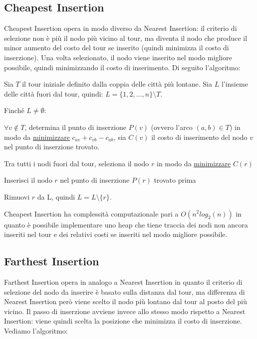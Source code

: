 \documentclass[a4paper,12pt]{report}
\begin{document}
\subsection{Cheapest Insertion} \label{ssec:CI}
Cheapest Insertion opera in modo diverso da Nearest Insertion: il criterio di selezione non è più il nodo più vicino al tour, ma diventa il nodo che produce il minor aumento del costo del tour se inserito (quindi minimizza il costo di inserzione). Una volta selezionato, il nodo viene inserito nel modo migliore possibile, quindi minimizzando il costo di inserimento. Di seguito l'algoritmo:

\begin{tcolorbox}[colframe=black,colback=white,boxrule=0.5pt, sharp corners]
  \begin{legal}
    \item Sia $T$ il tour iniziale definito dalla coppia delle città più lontane. Sia $L$ l'insieme delle città fuori dal tour, quindi: $L = \{1, 2, ..., n\} \setminus T$.
    \item Finché $L \neq \emptyset$:
    \begin{legal}
      \item $\forall v \not \in T$, determina il punto di inserzione $P(v)$ (ovvero l'arco $(a, b) \in T$) in modo da \underline{minimizzare} $c_{av} + c_{vb} - c_{ab}$, sia $C(v)$ il costo di inserimento del nodo $v$ nel punto di inserzione trovato.
      \item Tra tutti i nodi fuori dal tour, seleziona il nodo $r$ in modo da \underline{minimizzare} $C(r)$
      \item Inserisci il nodo $r$ nel punto di inserzione $P(r)$ trovato prima
      \item Rimuovi $r$ da L, quindi $L = L \setminus \{r\}$.
    \end{legal}
  \end{legal}
  \end{tcolorbox}
\hfill \break Cheapest Insertion ha complessità computazionale pari a $O(n^2 log_2(n))$ in quanto è possibile implementare uno heap che tiene traccia dei nodi non ancora inseriti nel tour e dei relativi costi se inseriti nel modo migliore possibile.

\subsection{Farthest Insertion} \label{ssec:FaI}
Farthest Insertion opera in analogo a Nearest Insertion in quanto il criterio di selezione del nodo da inserire è basato sulla distanza dal tour, ma differenza di Nearest Insertion però viene scelto il nodo più lontano dal tour al posto del più vicino. Il passo di inserzione avviene invece allo stesso modo rispetto a Nearest Insertion: viene quindi scelta la posizione che minimizza il costo di inserzione. Vediamo l'algoritmo:
\end{document}
